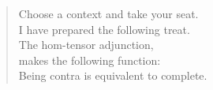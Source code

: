 
\vspace*{7cm}
\begin{verse}
    \hspace{8em}Choose a context and take your seat. \\
    \vspace{5pt}
    \hspace{8em}I have prepared the following treat. \\
    \vspace{5pt}
    \hspace{8em}The hom-tensor adjunction, \\
    \vspace{5pt}
    \hspace{8em}makes the following function: \\
    \vspace{5pt}
    \hspace{8em}Being contra is equivalent to complete. 

\end{verse}
